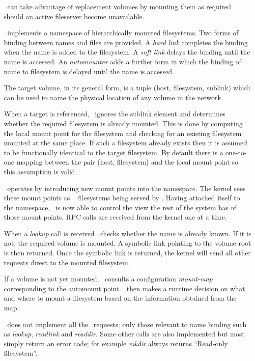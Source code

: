 \Amd\ can take advantage of replacement volumes by mounting
them as required should an active fileserver become unavailable.


\Unix\ implements a namespace of hierarchically mounted filesystems.
Two forms of binding between names and files are provided.
A {\em hard link} completes the binding when the name is added to the filesystem.
A {\em soft link} delays the binding until the name is accessed.
An {\em automounter} adds a further form in which the binding of name to
filesystem is delayed until the name is accessed.

The target volume, in its general form, is a tuple (host, filesystem, sublink)
which can be used to name the physical location of any volume in
the network.

When a target is referenced, \amd\ ignores the sublink element and determines
whether the required filesystem is already mounted.  This is done by computing
the local mount point for the filesystem and checking for an existing filesystem
mounted at the same place.  If such a filesystem already exists then it is
assumed to be functionally identical to the target filesystem.  By default
there is a one-to-one mapping between the pair (host, filesystem) and the local
mount point so this assumption is valid.


\Amd\ operates by introducing new mount points into the namespace.
The kernel sees these mount points as \NFS\ \cite{sun:nfs} filesystems being served by \amd.
Having attached itself to the namespace, \amd\ is now able to control
the view the rest of the system has of those mount points.
RPC \cite{sun:rpc} calls are received from the kernel one at a time.

When a {\em lookup} call is received \amd\ checks whether the
name is already known.  If it is not, the required volume is mounted.
A symbolic link pointing to the volume root is then returned.
Once the symbolic link is returned, the kernel will send all
other requests direct to the mounted filesystem.

If a volume is not yet mounted, \amd\ consults a configuration
{\em mount-map} corresponding to the automount point.
\Amd\ then makes a runtime decision on what and where to mount
a filesystem based on the information obtained from the map.

\Amd\ does not implement all the \NFS\ requests; only those
relevant to name binding such as {\em lookup}, {\em readlink}
and {\em readdir}.  Some other calls are also implemented
but most simply return an error code; for example {\em mkdir}
always returns ``Read-only filesystem''.

